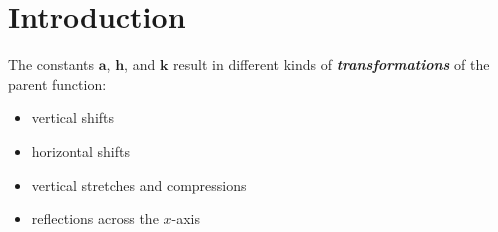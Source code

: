 

\section*{Introduction}

\begin{center}
\end{center}

\noindent The constants {$\mathbf a$}, {$\mathbf h$}, and {$\mathbf k$} result in 
different kinds of {\bfseries\itshape transformations} 
of the parent function:
\begin{itemize}[itemsep=0in]
    \item vertical shifts
    \item horizontal shifts
    \item vertical stretches and compressions
    \item reflections across the $x$-axis
\end{itemize}